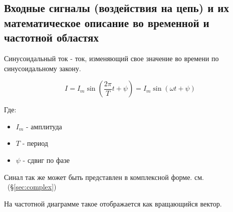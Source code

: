 \subsection{Входные сигналы (воздействия на цепь) и их математическое описание во временной и частотной областях}


Синусоидальный ток - ток, изменяющий свое значение во времени по синусоидальному закону.


\begin{equation}
I = I_m \sin(\frac{2 \pi }{T} t + \psi) = I_m \sin ( \omega t + \psi )
\end{equation}

Где:

\begin{itemize}
\item
$ I_m $  - амплитуда
\item
$ T $ - период
\item
$ \psi $ - сдвиг по фазе
\end{itemize}


Синал так же может быть представлен в комплексной форме. см. ~(\S \ref{sec:complex})

На частотной диаграмме такое отображается как вращающийся вектор.




\pagebreak